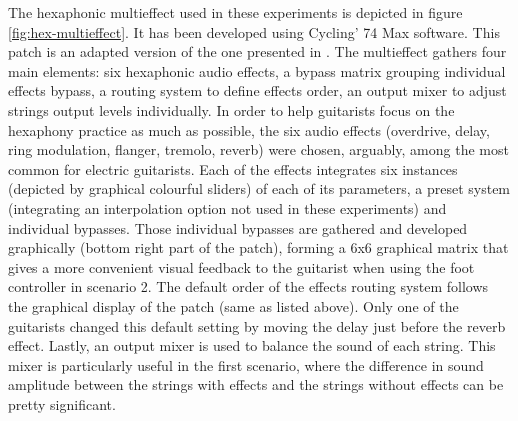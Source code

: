 \documentclass{article}
\begin{document}
The hexaphonic multieffect used in these experiments is depicted in figure \ref{fig:hex-multieffect}. It has been developed using Cycling' 74 Max software. This patch is an adapted version of the one presented in \cite{Reboursiere2020_Puzzle_eng}. The multieffect gathers four main elements: six hexaphonic audio effects, a bypass matrix grouping individual effects bypass, a routing system to define effects order, an output mixer to adjust strings  output levels individually. 
In order to help guitarists focus on the hexaphony practice as much as possible, the six audio effects (overdrive, delay, ring modulation, flanger, tremolo, reverb) were chosen, arguably, among the most common for electric guitarists. Each of the effects integrates six instances (depicted by graphical colourful sliders) of each of its parameters, a preset system (integrating an interpolation option not used in these experiments) and individual bypasses. 
Those individual bypasses are gathered and developed graphically (bottom right part of the patch), forming a 6x6 graphical matrix that gives a more convenient visual feedback to the guitarist when using the foot controller in scenario 2. 
The default order of the effects routing system follows the graphical display of the patch (same as listed above). Only one of the guitarists changed this default setting by moving the delay just before the reverb effect. 
Lastly, an output mixer is used to balance the sound of each string. This mixer is particularly useful in the first scenario, where the difference in sound amplitude between the strings with effects and the strings without effects can be pretty significant.
\end{document}
